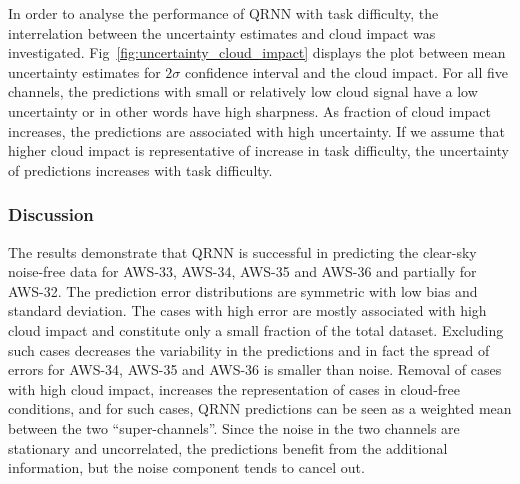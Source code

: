 \documentclass[amt, manuscript]{copernicus}
\begin{document}

In order to analyse the performance of QRNN with task difficulty, the interrelation between the uncertainty estimates and cloud impact was investigated. Fig~\ref{fig:uncertainty_cloud_impact} displays the plot between mean uncertainty estimates for $2\sigma$ confidence interval and the cloud impact. For all five channels, the predictions with small or relatively low cloud signal have a low uncertainty or in other words have high sharpness. As fraction of cloud impact increases, the predictions are associated with high uncertainty. If we assume that higher cloud impact is representative of increase in task difficulty, the uncertainty of predictions increases with task difficulty. 




\subsubsection{Discussion}
%
The results demonstrate that QRNN is successful in predicting the clear-sky
noise-free data for AWS-33, AWS-34, AWS-35 and AWS-36 and partially for AWS-32. The prediction error distributions are symmetric with low bias and standard deviation. The cases with high error are mostly associated with high cloud impact and constitute only a small fraction of the total dataset. Excluding such cases decreases the variability in the predictions and in fact the spread of errors for AWS-34, AWS-35 and AWS-36 is smaller than noise. Removal of cases with high cloud impact, increases the representation of cases in cloud-free conditions, and for such cases, QRNN predictions can be seen as a weighted mean between the two ``super-channels''. Since the noise in the two channels are stationary and uncorrelated, the predictions benefit from the additional information, but the noise component tends to cancel out. 
\end{document}
